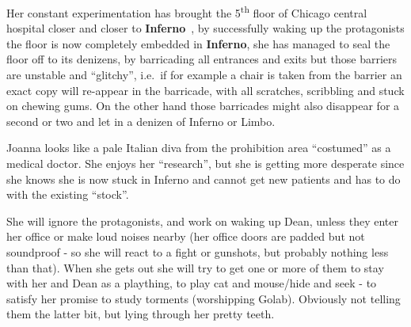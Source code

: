 Her constant experimentation has brought the 5\textsuperscript{th} floor of Chicago central hospital closer and closer to
\textbf{Inferno}~\cite[p.~314]{KULT:core}, by successfully waking up the protagonists the floor is now completely embedded in
\textbf{Inferno}, she has managed to seal the floor off to its denizens, by barricading all entrances and exits but those
barriers are unstable and “glitchy”, i.e.~if for example a chair is taken from the barrier an exact copy will re-appear in the
barricade, with all scratches, scribbling and stuck on chewing gums.  On the other hand those barricades might also disappear
for a second or two and let in a denizen of Inferno or Limbo.

Joanna looks like a pale Italian diva from the prohibition area “costumed” as a medical doctor.  She enjoys her “research”, but
she is getting more desperate since she knows she is now stuck in Inferno and cannot get new patients and has to do with the
existing “stock”.

She will ignore the protagonists, and work on waking up Dean, unless they enter her office or make loud noises nearby (her office
doors are padded but not soundproof - so she will react to a fight or gunshots, but probably nothing less than that). When she
gets out she will try to get one or more of them to stay with her and Dean as a plaything, to play cat and mouse/hide and seek -
to satisfy her promise to study torments (worshipping Golab). Obviously not telling them the latter bit, but lying through her
pretty teeth.


